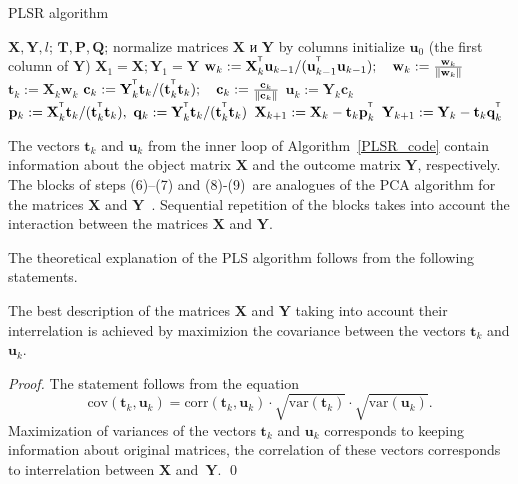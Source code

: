 \documentclass[runningheads]{llncs}
\newcommand{\bw}{\mathbf{w}}
\newcommand{\bY}{\mathbf{Y}}
\newcommand{\bX}{\mathbf{X}}
\newcommand{\bu}{\mathbf{u}}
\newcommand{\bt}{\mathbf{t}}
\newcommand{\bp}{\mathbf{p}}
\newcommand{\bq}{\mathbf{q}}
\newcommand{\bc}{\mathbf{c}}
\newcommand{\bP}{\mathbf{P}}
\newcommand{\bT}{\mathbf{T}}
\newcommand{\bQ}{\mathbf{Q}}
\newcommand{\T}{^{\text{\tiny\sffamily\upshape\mdseries T}}}
\begin{document}
\begin{algorithm}[h]
\caption{PLSR algorithm}
\label{PLSR_code}
\begin{algorithmic}[1]
	\REQUIRE $\bX, \bY, l$;
	\ENSURE $\bT, \bP, \bQ$;
	\STATE normalize matrices $\bX$ и $\bY$ by columns
	\STATE initialize $\bu_0$ (the first column of $\bY$)
	\STATE $\bX_1 = \bX; \bY_1 = \bY$
	\REPEAT
	\vspace{0.1cm}
	\STATE $\bw_k := \bX_k^{\T} \bu_{k-1} / (\bu_{k-1}^{\T} \bu_{k-1}); \quad \bw_k: = \frac{\bw_k}{\| \bw_k \|}$
	\vspace{0.1cm}
	\STATE $\bt_k := \bX_k \bw_k$
	\vspace{0.1cm}
	\STATE $\bc_k := \bY_k^{\T} \bt_k / (\bt_k^{\T} \bt_k); \quad \bc_k: = \frac{\bc_k}{\| \bc_k \|}$
	\vspace{0.1cm}
	\STATE $\bu_k := \bY_k \bc_k$
	\UNTIL{$\bt_k$ stabilizes}
	\vspace{0.1cm}
	\STATE $\bp_k:= \bX_k^{\T}\bt_k/(\bt_k^{\T}\bt_k),\ 
	\bq_k := \bY_k^{\T}\bt_k/(\bt_k^{\T}\bt_k)$
	\vspace{0.2cm}
	\STATE $\bX_{k+1} :=  \bX_k - \bt_k \bp_k^{\T}$
	\vspace{0.2cm}
	\STATE $\bY_{k + 1} :=  \bY_k - \bt_k \bq_k^{\T}$ 
	\ENDFOR
\end{algorithmic}
\end{algorithm}

The vectors $\bt_k$ and $\bu_k$ from the inner loop of Algorithm~\ref{PLSR_code} contain information about the object matrix $\bX$ and the outcome matrix $\bY$, respectively. 
The blocks of steps (6)--(7) and (8)-(9)~are analogues of the PCA algorithm for the matrices $\bX$ and $\bY$~\cite{geladi1986partial}. 
Sequential repetition of the blocks takes into account the interaction between the matrices $\bX$ and $\bY$.

The theoretical explanation of the PLS algorithm follows from the following statements.
\begin{proposition}
The best description of the matrices $\bX$ and $\bY$ taking into account their interrelation is achieved by maximizion the covariance between the vectors $\bt_k$ and $\bu_k$.
\end{proposition}
\begin{proof}
The statement follows from the equation
\[
\text{cov} (\bt_k, \bu_k) = \text{corr} (\bt_k, \bu_k) \cdot \sqrt{\text{var}(\bt_k)} \cdot \sqrt{\text{var}(\bu_k)}.
\]
Maximization of variances of the vectors $\bt_k$ and $\bu_k$ corresponds to keeping information about original matrices, the correlation of these vectors corresponds to interrelation between $\bX$ and~$\bY$. 
\qed 
\end{proof}
\end{document}
